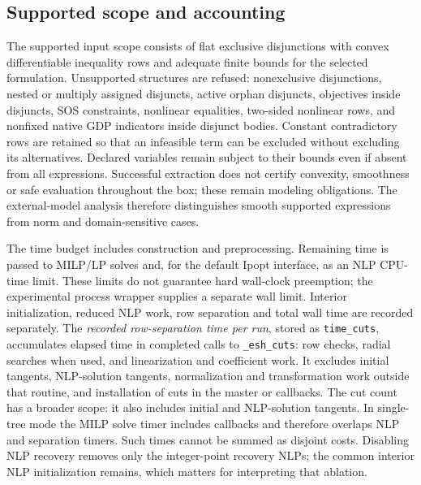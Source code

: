 \subsection{Supported scope and accounting}
The supported input scope consists of flat exclusive disjunctions with convex differentiable inequality rows and adequate finite bounds for the selected formulation. Unsupported structures are refused: nonexclusive disjunctions, nested or multiply assigned disjuncts, active orphan disjuncts, objectives inside disjuncts, SOS constraints, nonlinear equalities, two-sided nonlinear rows, and nonfixed native GDP indicators inside disjunct bodies. Constant contradictory rows are retained so that an infeasible term can be excluded without excluding its alternatives. Declared variables remain subject to their bounds even if absent from all expressions. Successful extraction does not certify convexity, smoothness or safe evaluation throughout the box; these remain modeling obligations. The external-model analysis therefore distinguishes smooth supported expressions from norm and domain-sensitive cases.

The time budget includes construction and preprocessing. Remaining time is passed to MILP/LP solves and, for the default Ipopt interface, as an NLP CPU-time limit. These limits do not guarantee hard wall-clock preemption; the experimental process wrapper supplies a separate wall limit. Interior initialization, reduced NLP work, row separation and total wall time are recorded separately. The \emph{recorded row-separation time per run}, stored as \texttt{time\_cuts}, accumulates elapsed time in completed calls to \texttt{\_esh\_cuts}: row checks, radial searches when used, and linearization and coefficient work. It excludes initial tangents, NLP-solution tangents, normalization and transformation work outside that routine, and installation of cuts in the master or callbacks. The cut count has a broader scope: it also includes initial and NLP-solution tangents. In single-tree mode the MILP solve timer includes callbacks and therefore overlaps NLP and separation timers. Such times cannot be summed as disjoint costs. Disabling NLP recovery removes only the integer-point recovery NLPs; the common interior NLP initialization remains, which matters for interpreting that ablation.
